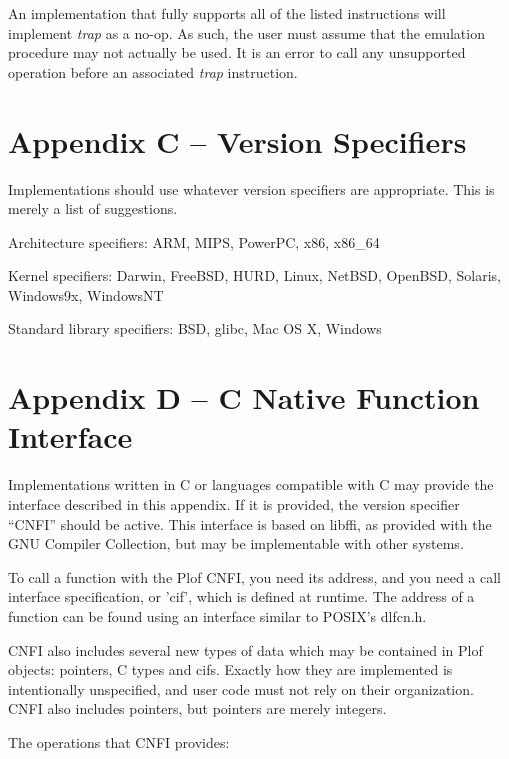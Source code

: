 An implementation that fully supports all of the listed instructions will implement \textit{trap} as a no-op. As such, the user must assume that the emulation procedure may not actually be used. It is an error to call any unsupported operation before an associated \textit{trap} instruction.



\chapter{Appendix C -- Version Specifiers}

Implementations should use whatever version specifiers are appropriate. This is merely a list of suggestions.

Architecture specifiers: ARM, MIPS, PowerPC, x86, x86\_64

Kernel specifiers: Darwin, FreeBSD, HURD, Linux, NetBSD, OpenBSD, Solaris, Windows9x, WindowsNT

Standard library specifiers: BSD, glibc, Mac OS X, Windows



\chapter{Appendix D -- C Native Function Interface}

Implementations written in C or languages compatible with C may provide the interface described in this appendix. If it is provided, the version specifier “CNFI” should be active. This interface is based on libffi, as provided with the GNU Compiler Collection, but may be implementable with other systems.

To call a function with the Plof CNFI, you need its address, and you need a call interface specification, or 'cif', which is defined at runtime. The address of a function can be found using an interface similar to POSIX's dlfcn.h.

CNFI also includes several new types of data which may be contained in Plof objects: pointers, C types and cifs. Exactly how they are implemented is intentionally unspecified, and user code must not rely on their organization. CNFI also includes pointers, but pointers are merely integers.

The operations that CNFI provides:

